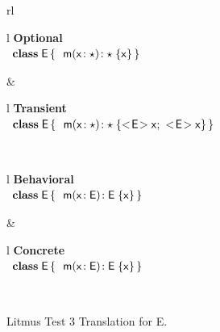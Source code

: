 \documentclass[runnningheads]{tex/llncs}
\begin{document}
\begin{figure}[!h]
  \begin{tabular}{rl}
\\
  \begin{tabular}{l}
    {\scriptsize\bf{Optional}} \\ 
\(
\begin{array}{l@{\,}l}
\Class{\xt E}{}{&\Mdef\m\x{\any}{\any}\x } \\
\end{array}
\) 
\end{tabular}&
  \begin{tabular}{l}
    {\scriptsize\bf{Transient}} \\
\(
\begin{array}{l@{\,}l}
\Class{\xt E}{}{&\Mdef\m\x\any\any{\idbody{\xt E}}} \\
\end{array}
\)
\end{tabular}\\
  \begin{tabular}{l}
    {\scriptsize\bf{Behavioral}} \\
\(
\begin{array}{l@{\,}l}
\Class{\xt E}{}{&\Mdef\m\x{\xt E}{\xt E}\x} \\
\end{array}
\) 
\end{tabular} &
  \begin{tabular}{l}
    {\scriptsize\bf{Concrete}} \\
\(
\begin{array}{l@{\,}l}
\Class{\xt E}{}{&\Mdef\m\x{\xt E}{\xt E}\x} \\
\end{array}
\) 
\end{tabular}\\
  \end{tabular}
  
 \caption{Litmus Test 3 Translation for {\xt E}.}  \label{fig:l3etrans}
\end{figure}
\end{document}
